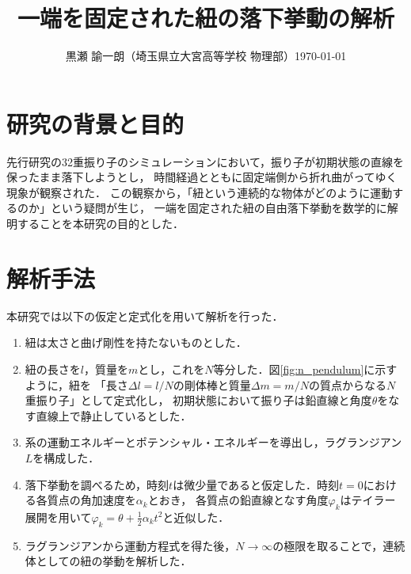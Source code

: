 \documentclass[9pt, twocolumn, a4paper]{ltjsarticle}
\title{\vspace{-15mm}\Large\textbf{一端を固定された紐の落下挙動の解析}}
\author{黒瀬 諭一朗（埼玉県立大宮高等学校 物理部）\quad \today}
\date{}
\begin{document}
\maketitle

\section{研究の背景と目的}
先行研究の32重振り子のシミュレーションにおいて，振り子が初期状態の直線を保ったまま落下しようとし，
時間経過とともに固定端側から折れ曲がってゆく現象が観察された．
この観察から，「紐という連続的な物体がどのように運動するのか」という疑問が生じ，
一端を固定された紐の自由落下挙動を数学的に解明することを本研究の目的とした．

\section{解析手法}
本研究では以下の仮定と定式化を用いて解析を行った．
\begin{enumerate}
  \item 紐は太さと曲げ剛性を持たないものとした．
  \item 紐の長さを$l$，質量を$m$とし，これを$N$等分した．図\ref{fig:n_pendulum}に示すように，紐を
        「長さ$\Delta l = l / N$の剛体棒と質量$\Delta m = m / N$の質点からなる$N$重振り子」として定式化し，
        初期状態において振り子は鉛直線と角度$\theta$をなす直線上で静止しているとした．
  \item 系の運動エネルギーとポテンシャル・エネルギーを導出し，ラグランジアン$L$を構成した．
  \item 落下挙動を調べるため，時刻$t$は微少量であると仮定した．時刻$t = 0$における各質点の角加速度を$\alpha_k$とおき，
        各質点の鉛直線となす角度$\varphi_k$はテイラー展開を用いて$\varphi_k = \theta + \frac{1}{2} \alpha_k t^2$と近似した．
  \item ラグランジアンから運動方程式を得た後，$N \to \infty$の極限を取ることで，連続体としての紐の挙動を解析した．
\end{enumerate}
\end{document}
